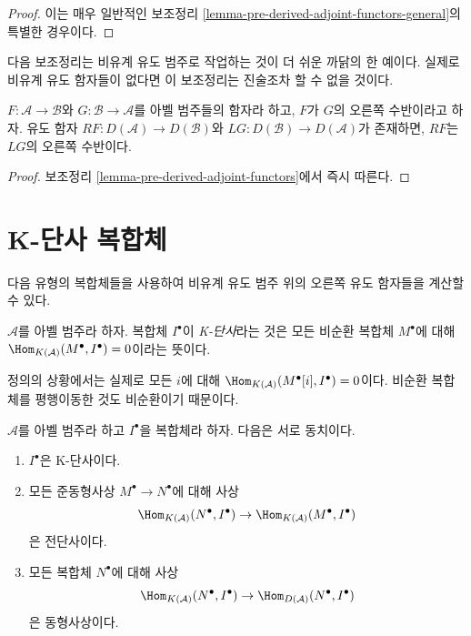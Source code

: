 \begin{proof}
이는 매우 일반적인 보조정리
\ref{lemma-pre-derived-adjoint-functors-general}의 특별한 경우이다.
\end{proof}

\noindent
다음 보조정리는 비유계 유도 범주로 작업하는 것이 더 쉬운 까닭의
한 예이다. 실제로 비유계 유도 함자들이 없다면 이 보조정리는
진술조차 할 수 없을 것이다.

\begin{lemma}
\label{lemma-derived-adjoint-functors}
$F : \mathcal{A} \to \mathcal{B}$와
$G : \mathcal{B} \to \mathcal{A}$를 아벨 범주들의 함자라 하고,
$F$가 $G$의 오른쪽 수반이라고 하자.
유도 함자 $RF : D(\mathcal{A}) \to D(\mathcal{B})$와
$LG : D(\mathcal{B}) \to D(\mathcal{A})$가 존재하면,
$RF$는 $LG$의 오른쪽 수반이다.
\end{lemma}

\begin{proof}
보조정리 \ref{lemma-pre-derived-adjoint-functors}에서 즉시 따른다.
\end{proof}

\section{K-단사 복합체}
\label{section-K-injective}

\noindent
다음 유형의 복합체들을 사용하여 비유계 유도 범주 위의 오른쪽 유도
함자들을 계산할 수 있다.

\begin{definition}
\label{definition-K-injective}
$\mathcal{A}$를 아벨 범주라 하자. 복합체 $I^\bullet$이
{\it K-단사}라는 것은 모든 비순환 복합체 $M^\bullet$에 대해
$\Hom_{K(\mathcal{A})}(M^\bullet, I^\bullet) = 0$이라는 뜻이다.
\end{definition}

\noindent
정의의 상황에서는 실제로 모든 $i$에 대해
$\Hom_{K(\mathcal{A})}(M^\bullet[i], I^\bullet) = 0$이다. 비순환
복합체를 평행이동한 것도 비순환이기 때문이다.

\begin{lemma}
\label{lemma-K-injective}
$\mathcal{A}$를 아벨 범주라 하고 $I^\bullet$을 복합체라 하자.
다음은 서로 동치이다.
\begin{enumerate}
\item $I^\bullet$은 K-단사이다.
\item 모든 준동형사상 $M^\bullet \to N^\bullet$에 대해 사상
$$
\Hom_{K(\mathcal{A})}(N^\bullet, I^\bullet)
\to \Hom_{K(\mathcal{A})}(M^\bullet, I^\bullet)
$$
은 전단사이다.
\item 모든 복합체 $N^\bullet$에 대해 사상
$$
\Hom_{K(\mathcal{A})}(N^\bullet, I^\bullet)
\to \Hom_{D(\mathcal{A})}(N^\bullet, I^\bullet)
$$
은 동형사상이다.
\end{enumerate}
\end{lemma}

